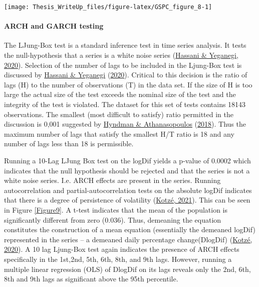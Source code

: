 \documentclass[11pt,preprint, authoryear]{elsarticle}
\let\origfigure\figure
\let\endorigfigure\endfigure
\renewenvironment{figure}[1][2] {
    \expandafter\origfigure\expandafter[H]
} {
    \endorigfigure
}
\numberwithin{equation}{section}
\numberwithin{figure}{section}
\numberwithin{table}{section}
\begin{document}
\begin{figure}[H]

{\centering \texttt{[image: Thesis\_WriteUp\_files/figure-latex/GSPC\_figure\_8-1]} 

}

\caption{stdVolControlled and absolute LogDiff \label{Figure8}}\label{fig:GSPC_figure_8}
\end{figure}

\hypertarget{arch-and-garch-testing}{%
\paragraph{\texorpdfstring{ARCH and GARCH testing
\label{ARCHandGARCH}}{ARCH and GARCH testing }}\label{arch-and-garch-testing}}

The LJung-Box test is a standard inference test in time series analysis.
It tests the null-hypothesis that a series is a white noise series
(\protect\hyperlink{ref-hassani2020selecting}{Hassani \& Yeganegi,
2020}). Selection of the number of lags to be included in the Ljung-Box
test is discussed by
\protect\hyperlink{ref-hassani2020selecting}{Hassani \& Yeganegi}
(\protect\hyperlink{ref-hassani2020selecting}{2020}). Critical to this
decision is the ratio of lags (H) to the number of observations (T) in
the data set. If the size of H is too large the actual size of the test
exceeds the nominal size of the test and the integrity of the test is
violated. The dataset for this set of tests contains 18143 observations.
The smallest (most difficult to satisfy) ratio permitted in the
discussion is 0,001 suggested by
\protect\hyperlink{ref-hyndman2018forecasting}{Hyndman \&
Athanasopoulos} (\protect\hyperlink{ref-hyndman2018forecasting}{2018}).
Thus the maximum number of lags that satisfy the smallest H/T ratio is
18 and any number of lags less than 18 is permissible.

Running a 10-Lag LJung Box test on the logDif yields a p-value of 0.0002
which indicates that the null hypothesis should be rejected and that the
series is not a white noise series. I.e. ARCH effects are present in the
series. Running autocorrelation and partial-autocorrelation tests on the
absolute logDif indicates that there is a degree of persistence of
volatility (\protect\hyperlink{ref-kotze2021volatility}{Kotzé, 2021}).
This can be seen in Figure \ref{Figure9}. A t-test indicates that the
mean of the population is significantly different from zero (0.036).
Thus, demeaning the equation constitutes the construction of a mean
equation (essentially the demeaned logDif) represented in the series --
a demeaned daily percentage change(DlogDif)
(\protect\hyperlink{ref-kotze2020univariate}{Kotzé, 2020}). A 10 lag
Ljung-Box test again indicates the presence of ARCH effects specifically
in the 1st,2nd, 5th, 6th, 8th, and 9th lags. However, running a multiple
linear regression (OLS) of DlogDif on its lags reveals only the 2nd,
6th, 8th and 9th lags as significant above the 95th percentile.
\end{document}
